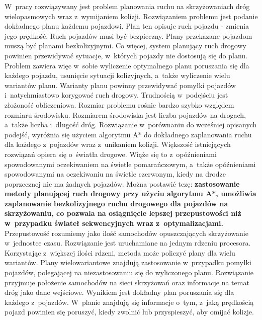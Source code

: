  \label{chap:thesis}

W~pracy rozwiązywany jest problem planowania ruchu na skrzyżowaniach dróg wielopasmowych wraz z~wymijaniem kolizji. Rozwiązaniem problemu jest podanie dokładnego planu każdemu pojazdowi. Plan ten opisuje ruch pojazdu - zmienia jego prędkość. Ruch pojazdów musi być bezpieczny. Plany przekazane pojazdom muszą być planami bezkolizyjnymi. Co więcej, system planujący ruch drogowy powinien przewidywać sytuacje, w~których pojazdy nie dostosują się do planu. Problem zawiera więc w~sobie wyliczenie optymalnego planu poruszania się dla każdego pojazdu, usunięcie sytuacji kolizyjnych, a~także wyliczenie wielu wariantów planu. Warianty planu powinny przewidywać pomyłki pojazdów i~natychmiastowo korygować ruch drogowy. Trudnością w~podejściu jest złożoność obliczeniowa. Rozmiar problemu rośnie bardzo szybko względem rozmiaru środowisku. Rozmiarem środowiska jest liczba pojazdów na drogach, a~także liczba i~długość dróg.
\newline
\indent
Rozwiązanie w~porównaniu do wcześniej opisanych podejść, wyróżnia się użyciem algorytmu A* do dokładnego zaplanowania ruchu dla każdego z~pojazdów wraz z~unikaniem kolizji. Większość istniejących rozwiązań opiera się o~światła drogowe. Wiąże się to z~opóźnieniami spowodowanymi oczekiwaniem na świetle pomarańczowym, a~także opóźnieniami spowodowanymi na oczekiwaniu na świetle czerwonym, kiedy na drodze poprzecznej nie ma żadnych pojazdów.
\newline
\indent
Można postawić tezę: \textbf{zastosowanie metody planującej ruch drogowy przy użyciu algorytmu A*, umożliwia zaplanowanie bezkolizyjnego ruchu drogowego dla pojazdów na skrzyżowaniu, co pozwala na osiągnięcie lepszej przepustowości niż w~przypadku świateł sekwencyjnych wraz z~optymalizacjami.} Przepustowość rozumiemy jako ilość samochodów opuszczających skrzyżowanie w~jednostce czasu. Rozwiązanie jest uruchamiane na jednym rdzeniu procesora. Korzystając z~większej ilości rdzeni, metoda może policzyć plany dla wielu wariantów. Plany wielowariantowe znajdują zastosowanie w~przypadku pomyłki pojazdów, polegającej na niezastosowaniu się do wyliczonego planu.
\newline
\indent
Rozwiązanie przyjmuje położenie samochodów na sieci skrzyżowań oraz informacje na temat dróg jako dane wejściowe. Wynikiem jest dokładny plan poruszania się dla każdego z~pojazdów. W~planie znajdują się informacje o~tym, z~jaką prędkością pojazd powinien się poruszyć, kiedy zwolnić lub przyspieszyć, aby omijać kolizje.
